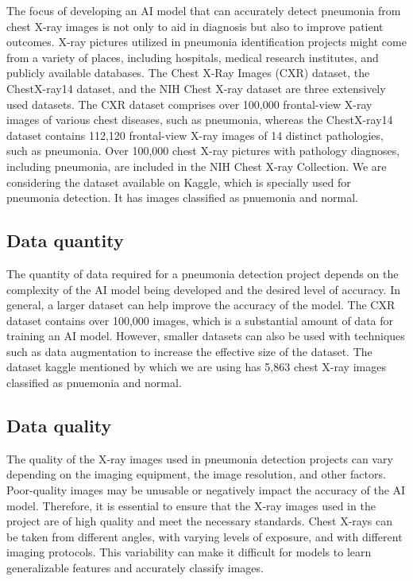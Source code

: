 The focus of developing an AI model that can accurately detect pneumonia from chest X-ray images is not only to aid in diagnosis but also to improve patient outcomes. X-ray pictures utilized in pneumonia identification projects might come from a variety of places, including hospitals, medical research institutes, and publicly available databases. \cite{Wang:2017}The Chest X-Ray Images (CXR) dataset, the ChestX-ray14 dataset, and the NIH Chest X-ray dataset are three extensively used datasets. The CXR dataset comprises over 100,000 frontal-view X-ray images of various chest diseases, such as pneumonia, whereas the ChestX-ray14 dataset contains 112,120 frontal-view X-ray images of 14 distinct pathologies, such as pneumonia. Over 100,000 chest X-ray pictures with pathology diagnoses, including pneumonia, are included in the NIH Chest X-ray Collection. We are considering the dataset available on Kaggle, which is specially used for pneumonia detection. It has images classified as pnuemonia and normal.\\

\subsection{Data quantity}

The quantity of data required for a pneumonia detection project depends on the complexity of the AI model being developed and the desired level of accuracy. In general, a larger dataset can help improve the accuracy of the model. The CXR dataset contains over 100,000 images, which is a substantial amount of data for training an AI model. However, smaller datasets can also be used with techniques such as data augmentation to increase the effective size of the dataset. The dataset kaggle mentioned by \autocite{Kermany:2018}which we are using has 5,863  chest X-ray images classified as pnuemonia and normal.\\

\subsection{Data quality}

The quality of the X-ray images used in pneumonia detection projects can vary depending on the imaging equipment, the image resolution, and other factors. Poor-quality images may be unusable or negatively impact the accuracy of the AI model. Therefore, it is essential to ensure that the X-ray images used in the project are of high quality and meet the necessary standards. Chest X-rays can be taken from different angles, with varying levels of exposure, and with different imaging protocols. This variability can make it difficult for models to learn generalizable features and accurately classify images. \autocite{Rajpurkar:2017}

